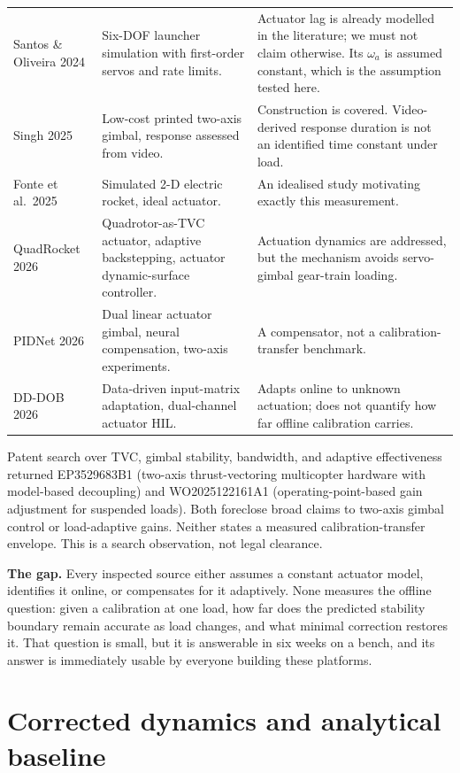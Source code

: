 \documentclass[11pt,a4paper]{article}
\begin{document}
\begin{longtable}{p{3.0cm}p{6.0cm}p{6.0cm}}
Santos \& Oliveira 2024 \cite{santos2024} &
Six-DOF launcher simulation with first-order servos and rate limits. &
Actuator lag is already modelled in the literature; we must not claim otherwise. Its $\omega_a$
is assumed constant, which is the assumption tested here. \\
Singh 2025 \cite{singh2025} &
Low-cost printed two-axis gimbal, response assessed from video. &
Construction is covered. Video-derived response duration is not an identified time constant under load. \\
Fonte et al.\ 2025 \cite{fonte2025} &
Simulated 2-D electric rocket, ideal actuator. &
An idealised study motivating exactly this measurement. \\
QuadRocket 2026 \cite{quadrocket2026} &
Quadrotor-as-TVC actuator, adaptive backstepping, actuator dynamic-surface controller. &
Actuation dynamics are addressed, but the mechanism avoids servo-gimbal gear-train loading. \\
PIDNet 2026 \cite{pidnet2026} &
Dual linear actuator gimbal, neural compensation, two-axis experiments. &
A compensator, not a calibration-transfer benchmark. \\
DD-DOB 2026 \cite{ddobs2026} &
Data-driven input-matrix adaptation, dual-channel actuator HIL. &
Adapts online to unknown actuation; does not quantify how far offline calibration carries. \\
\bottomrule
\end{longtable}

Patent search over TVC, gimbal stability, bandwidth, and adaptive effectiveness returned
EP3529683B1 \cite{ep3529683} (two-axis thrust-vectoring multicopter hardware with model-based
decoupling) and WO2025122161A1 \cite{wo2025122161} (operating-point-based gain adjustment for
suspended loads). Both foreclose broad claims to two-axis gimbal control or load-adaptive gains.
Neither states a measured calibration-transfer envelope. This is a search observation, not legal
clearance.

\textbf{The gap.} Every inspected source either assumes a constant actuator model, identifies it
online, or compensates for it adaptively. None measures the offline question: given a calibration at
one load, how far does the predicted stability boundary remain accurate as load changes, and what
minimal correction restores it. That question is small, but it is answerable in six weeks on a bench,
and its answer is immediately usable by everyone building these platforms.

\section{Corrected dynamics and analytical baseline}\label{sec:analysis}
\end{document}
